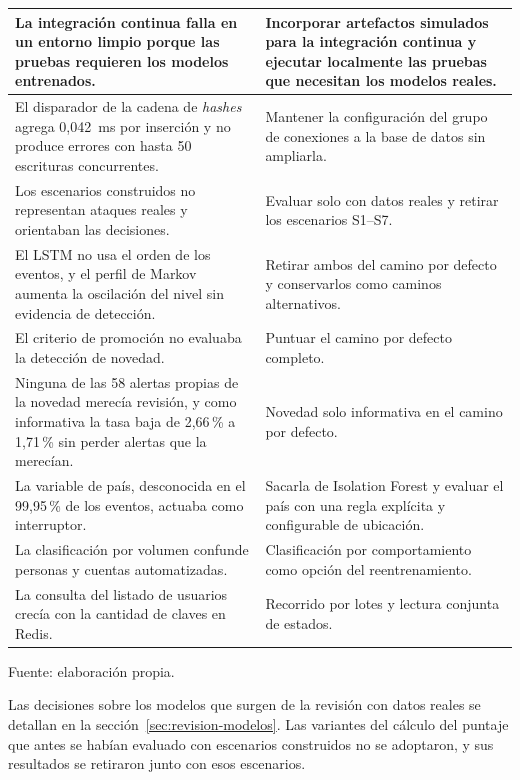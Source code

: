 \begin{longtable}{>{\raggedright\arraybackslash}p{7.0cm}>{\raggedright\arraybackslash}p{7.1cm}}
	\hline
	La integración continua falla en un entorno limpio porque las pruebas requieren los modelos entrenados. & Incorporar artefactos simulados para la integración continua y ejecutar localmente las pruebas que necesitan los modelos reales. \\
	\hline
	El disparador de la cadena de \emph{hashes} agrega 0,042~ms por inserción y no produce errores con hasta 50 escrituras concurrentes. & Mantener la configuración del grupo de conexiones a la base de datos sin ampliarla. \\
	\hline
	Los escenarios construidos no representan ataques reales y orientaban las decisiones. & Evaluar solo con datos reales y retirar los escenarios S1--S7. \\
	\hline
	El LSTM no usa el orden de los eventos, y el perfil de Markov aumenta la oscilación del nivel sin evidencia de detección. & Retirar ambos del camino por defecto y conservarlos como caminos alternativos. \\
	\hline
	El criterio de promoción no evaluaba la detección de novedad. & Puntuar el camino por defecto completo. \\
	\hline
	Ninguna de las 58 alertas propias de la novedad merecía revisión, y como informativa la tasa baja de 2,66\,\% a 1,71\,\% sin perder alertas que la merecían. & Novedad solo informativa en el camino por defecto. \\
	\hline
	La variable de país, desconocida en el 99,95\,\% de los eventos, actuaba como interruptor. & Sacarla de Isolation Forest y evaluar el país con una regla explícita y configurable de ubicación. \\
	\hline
	La clasificación por volumen confunde personas y cuentas automatizadas. & Clasificación por comportamiento como opción del reentrenamiento. \\
	\hline
	La consulta del listado de usuarios crecía con la cantidad de claves en Redis. & Recorrido por lotes y lectura conjunta de estados. \\
	\hline
\end{longtable}
{\small Fuente: elaboración propia.\par}

Las decisiones sobre los modelos que surgen de la revisión con datos reales se detallan en la sección~\ref{sec:revision-modelos}. Las variantes del cálculo del puntaje que antes se habían evaluado con escenarios construidos no se adoptaron, y sus resultados se retiraron junto con esos escenarios.


